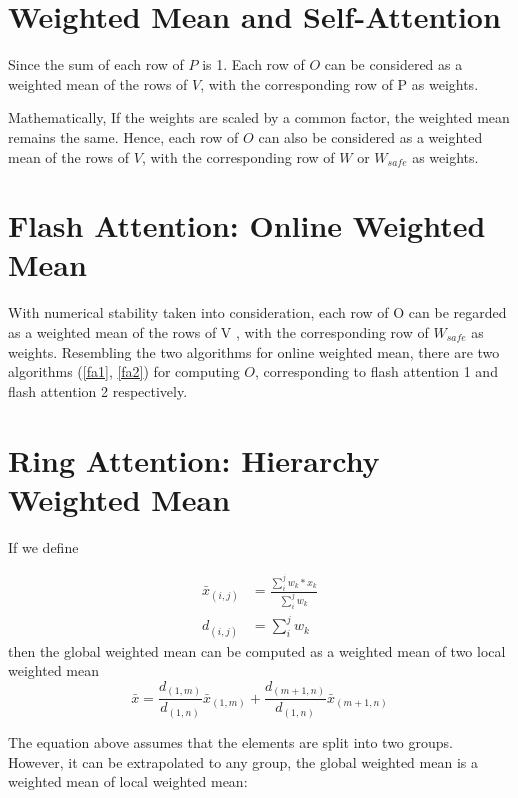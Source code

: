 \documentclass[a4paper]{article}
\begin{document}
    \section{Weighted Mean and Self-Attention}

    \par
    Since the sum of each row of $P$ is 1. Each row of $O$ can be considered as a weighted mean of the rows of $V$, with the corresponding row of P as weights.
    \newline
    \par
    Mathematically,  If the weights are scaled by a common factor, the weighted mean remains the same. Hence,
    each row of $O$ can also be considered as a weighted mean of the rows of $V$, with the corresponding row of $W$ or $W_{safe}$ as weights.

    \section{Flash Attention: Online Weighted Mean}

    With numerical stability taken into consideration, each row of O can be regarded as a weighted mean of the rows of V , with the corresponding row of $W_{safe}$ as weights. Resembling the two algorithms for online weighted mean, there are two algorithms  (\ref{fa1}, \ref{fa2}) for computing $O$, corresponding to flash attention 1 and flash attention 2 respectively.


    \section{Ring Attention: Hierarchy Weighted Mean}

    If we define

    \begin{align}
        \bar{x}_{(i,j)} &= \frac{\sum_{i}^{j} w_k*x_k}{\sum_{i}^{j}w_{k}} \\
        d_{(i,j)} &= \sum_{i}^{j}w_{k}
    \end{align}
    then the global weighted mean can be computed as a weighted mean of two local weighted mean
    \begin{equation}
        \bar{x} = \frac{d_{(1,m)}}{d_{(1,n)}} \bar{x}_{(1,m)} + \frac{d_{(m+1,n)}}{d_{(1,n)}}\bar{x}_{(m+1,n)}
    \end{equation}

    The equation above assumes that the elements are split into two groups. However, it can be extrapolated to any group, the global weighted mean is a weighted mean of local weighted mean:
\end{document}
